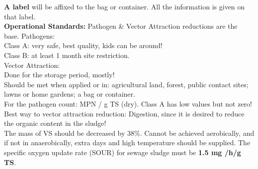 \documentclass{article}
\numberwithin{equation}{section}
\begin{document}
\textbf{A label} will be affixed to the bag or container. All the information is given on that label.\\
\textbf{Operational Standards:} Pathogen \& Vector Attraction reductions are the base.
Pathogens:\\
Class A: very safe, best quality, kids can be around!\\
Class B: at least 1 month site restriction.\\
Vector Attraction:\\
Done for the storage period, mostly!\\
Should be met when applied or in: agricultural land, forest, public contact sites; lawns or home gardens; a bag or container.\\
For the pathogen count: MPN / g TS (dry). Class A has low values but not zero!\\
Best way to vector attraction reduction: Digestion, since it is desired to reduce the organic content in the sludge!\\
The mass of VS should be decreased by 38\%. Cannot be achieved aerobically, and if not in anaerobically, extra days and high temperature should be supplied. The specific oxygen update rate (SOUR) for sewage sludge must be \textbf{1.5 mg /h/g TS}.
\printbibliography[heading=bibintoc]
\label{LastPage}
\end{document}
